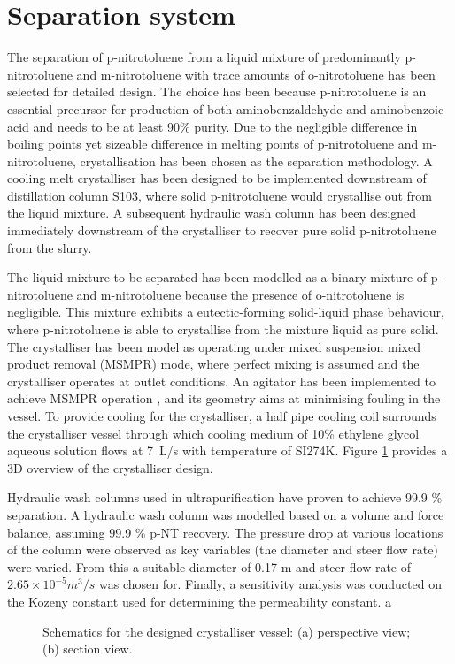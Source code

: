 \section*{Separation system}

The separation of p-nitrotoluene from a liquid mixture of predominantly p-nitrotoluene and m-nitrotoluene with trace amounts of o-nitrotoluene has been selected for detailed design. The choice has been because p-nitrotoluene is an essential precursor for production of both aminobenzaldehyde and aminobenzoic acid and needs to be at least 90\% purity. Due to the negligible difference in boiling points yet sizeable difference in melting points of p-nitrotoluene and m-nitrotoluene, crystallisation has been chosen as the separation methodology. A cooling melt crystalliser has been designed to be implemented downstream of distillation column S103, where solid p-nitrotoluene would crystallise out from the liquid mixture. A subsequent hydraulic wash column has been designed immediately downstream of the crystalliser to recover pure solid p-nitrotoluene from the slurry. 


The liquid mixture to be separated has been modelled as a binary mixture of p-nitrotoluene and m-nitrotoluene because the presence of o-nitrotoluene is negligible. This mixture exhibits a eutectic-forming solid-liquid phase behaviour, where p-nitrotoluene is able to crystallise from the mixture liquid as pure solid. The crystalliser has been model as operating under mixed suspension mixed product removal (MSMPR) mode, where perfect mixing is assumed and the crystalliser operates at outlet conditions. An agitator has been implemented to achieve MSMPR operation , and its geometry aims at minimising fouling in the vessel. To provide cooling for the crystalliser, a half pipe cooling coil surrounds the crystalliser vessel through which cooling medium of 10\% ethylene glycol aqueous solution flows at \SI{7}{L/s} with temperature of SI{274}{K}. Figure \ref{fig:crystalliser schematic executive} provides a 3D overview of the crystalliser design.


Hydraulic wash columns used in ultrapurification have proven to achieve 99.9 \% separation. A hydraulic wash column was modelled based on a volume and force balance, assuming 99.9 \% p-NT recovery. The pressure drop at various locations of the column were observed as key variables (the diameter and steer flow rate) were varied. From this a suitable diameter of 0.17 m and steer flow rate  of $2.65 \times 10^{-5} m^{3}/s$ was chosen for. Finally, a sensitivity analysis was conducted on the Kozeny constant used for determining the permeability constant. 
 a
\begin{figure}[h]
    \centering
    
    \caption{Schematics for the designed crystalliser vessel: (a) perspective view; (b) section view.}
    \label{fig:crystalliser schematic executive}
\end{figure}

